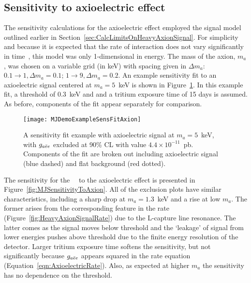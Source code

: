 		\subsection{Sensitivity to axioelectric effect}
		\label{sec:MJSensitivityToAxions}
		
	The sensitivity calculations for the axioelectric effect employed the signal model outlined earlier in Section~\ref{sec:CalcLimitsOnHeavyAxionSignal}.  For simplicity and because it is expected that the rate of interaction does not vary significantly in time~\cite{Pospelov:2008jk}, this model was only 1-dimensional in energy.  The mass of the axion, $m_{a}$, was chosen on a variable grid (in keV) with spacing given in $\Delta m_{a}$: $0.1\to1, \Delta m_{a} = 0.1$; $1\to9, \Delta m_{a} = 0.2$.  An example sensitivity fit to an axioelectric signal centered at $m_{a}=5$~keV is shown in Figure~\ref{fig:MJSensitivityToAxionExample}.  In this example fit, a threshold of 0.3~keV and and a tritium exposure time of 15 days is assumed.  As before, components of the fit appear separately for comparison.   
		
			\begin{figure}
				\centering
				\texttt{[image: MJDemoExampleSensFitAxion]}
				\caption[\MJ~\minmod axioelectric sensitivity fit example.]{A sensitivity fit example 
				with axioelectric signal at $m_{a}=5$~keV, with $g_{a\bar{e}e}$ excluded at 90\% CL with
				value
				 $4.4\times10^{-11}$~pb.  Components of the fit are broken out including axioelectric 
				 signal (blue dashed) and flat background (red dotted).  }
				\label{fig:MJSensitivityToAxionExample}
			\end{figure}
	
	The sensitivity for the \MJ~\minmod~to the axioelectric effect is presented in Figure~\ref{fig:MJSensitivityToAxion}.  All of the exclusion plots have similar characteristics, including a sharp drop at $m_{a}=1.3$~keV and a rise at low $m_{a}$.  The former arises from the corresponding feature in the rate (Figure~\ref{fig:HeavyAxionSignalRate}) due to the L-capture line resonance.  The latter comes as the signal moves below threshold and the `leakage' of signal from lower energies pushes above threshold due to the finite energy resolution of the detector.  Larger tritium exposure time softens the sensitivity, but not significantly because $g_{a\bar{e}e}$ appears squared in the rate equation (Equation~\ref{eqn:AxioelectricRate}).  Also, as expected at higher $m_{a}$ the sensitivity has no dependence on the threshold.
	
